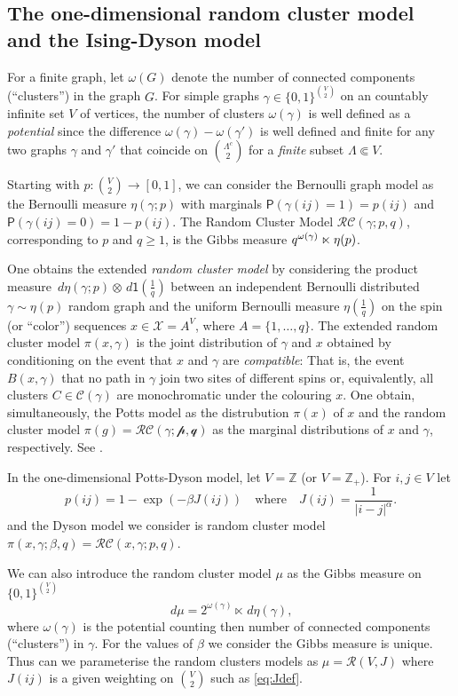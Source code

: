\documentclass[11pt, a4paper, oneside]{article}
\theoremstyle{definition}
\theoremstyle{remark}
\renewcommand{\d}{\,d}
\providecommand{\ZZ}{\mathbb{Z}}
\providecommand{\mscr}{\mathscr}
\renewcommand{\P}{\mathsf{P}}
\providecommand{\ett}{\mathsf{1}}
\providecommand{\g}{\gamma}
\providecommand{\w}{\omega}
\def\X{\mscr X}
\begin{document}
\subsection{The one-dimensional random cluster model and the Ising-Dyson model}

For a finite graph, let $\w(G)$ denote the number of connected components
(``clusters'') in the graph $G$. For simple graphs $\g\in \{0,1\}^{\binom V2}$
on an countably infinite set $V$ of vertices, the number of clusters $\w(\g)$ is
well defined as a \emph{potential} since the difference $\w(\g)-\w(\g')$ is well
defined and finite for any two graphs $\g$ and $\g'$ that coincide on
$\binom{\Lambda^c}{2}$ for a \emph{finite} subset $\Lambda\Subset V$.

Starting with $p:\binom V2\to [0,1]$, we can consider the Bernoulli graph model
as the Bernoulli measure $\eta(\g;p)$ with marginals $\P(\g(ij)=1)=p(ij)$ and
$\P(\g(ij)=0)=1-p(ij)$. The Random Cluster Model $\mscr{RC}(\g; p,q)$,
corresponding to $p$ and $q\ge1$, is the Gibbs measure
$q^{\w(\g)} \gibbs \eta(p)$.

One obtains the extended \emph{random cluster model} by considering the product
measure $\d\eta(\g;p) \otimes \d\ett(\frac 1q)$ between an independent Bernoulli
distributed $\g\sim\eta(p)$ random graph and the uniform Bernoulli measure
$\eta(\frac1q)$ on the spin (or ``color'') sequences $x\in\X=A^{V}$, where
$A=\{1,\dots,q\}$. The extended random cluster model $\pi(x,\g)$ is the joint
distribution of $\g$ and $x$ obtained by conditioning on the event that $x$ and
$\g$ are \emph{compatible}: That is, the event $B(x,\g)$ that no path in $\g$
join two sites of different spins or, equivalently, all clusters
$C\in\mscr C(\g)$ are monochromatic under the colouring $x$. One obtain,
simultaneously, the Potts model as the distrubution $\pi(x)$ of $x$ and the
random cluster model $\pi(g)=\mscr{RC(\g;p,q)}$ as the marginal distributions of
$x$ and $\g$, respectively. See \cite{grimmet}.

In the one-dimensional Potts-Dyson model, let $V=\ZZ$ (or $V=\ZZ_+$). For
$i,j\in V$ let
\begin{equation}\label{eq:Jdef}
  p(ij) = 1-\exp(-\beta J(ij)) \quad\text{where}\quad J({ij}) = \frac 1{|i-j|^\alpha}.
\end{equation}
and the Dyson model we consider is random cluster model
$\pi(x,\g;\beta,q)=\mscr{RC}(x,\g; p,q)$.


We can also introduce the random cluster model $\mu$ as the Gibbs measure on
$\{0,1\}^{\binom V2}$
$$ \d\mu = 2^{\w(\g)} \ltimes \d\eta(\g), $$
where $\w(\g)$ is the potential counting then number of connected components
(``clusters'') in $\g$. For the values of $\beta$ we consider the Gibbs measure
is unique. Thus can we parameterise the random clusters models as
$\mu = \mscr R(V,J)$ where $J(ij)$ is a given weighting on $\binom V2$ such as
\eqref{eq:Jdef}.
\end{document}
